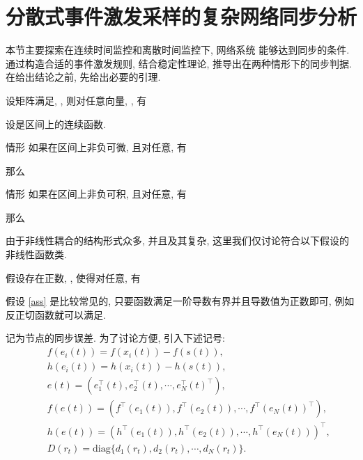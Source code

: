 \section{分散式事件激发采样的复杂网络同步分析}
    本节主要探索在连续时间监控和离散时间监控下, 网络系统  能够达到同步的条件. 通过构造合适的事件激发规则, 结合稳定性理论, 推导出在两种情形下的同步判据. 在给出结论之前, 先给出必要的引理.
    \begin{lem}\label{lem:5}
            设矩阵满足, , 则对任意向量, , 有

    \end{lem}
    \begin{lem}\label{lem:6}{\rm{}}
        设是区间上的连续函数.

       情形 如果在区间上非负可微, 且对任意, 有

       那么


       情形 如果在区间上非负可积, 且对任意, 有

         那么

    \end{lem}
    由于非线性耦合的结构形式众多, 并且及其复杂, 这里我们仅讨论符合以下假设的非线性函数类.
    \begin{hyp}\label{ass}
        假设存在正数, , 使得对任意, 有

    \end{hyp}
    \begin{rem}
        假设 \ref{ass} 是比较常见的, 只要函数满足一阶导数有界并且导数值为正数即可, 例如反正切函数就可以满足.
    \end{rem}
    记为节点的同步误差. 为了讨论方便, 引入下述记号:
        \begin{eqnarray*}
        &&f(e_{i}(t))=f(x_{i}(t))-f(s(t)),\\
        &&h(e_{i}(t))=h(x_{i}(t))-h(s(t)),\\
        &&e(t)=(e^\top_{1}(t),e^\top_{2}(t),\cdots,e^\top_{N}(t)^\top),\\
        &&f(e(t))=(f^\top(e_{1}(t)),f^\top(e_{2}(t)),\cdots,f^\top(e_{N}(t))^\top),\\
        &&h(e(t))=(h^\top(e_{1}(t)),h^\top(e_{2}(t)),\cdots,h^\top(e_{N}(t)))^\top,\\
        &&D(r_{t})=\text{diag}\{d_{1}(r_{t}),d_{2}(r_{t}),\cdots,d_{N}(r_{t})\}.
        \end{eqnarray*}
